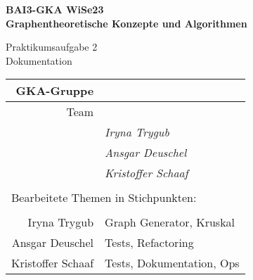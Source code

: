 

\thispagestyle{empty}
\begin{center}

    {\large {\bf   BAI3-GKA WiSe23 \\ Graphentheoretische Konzepte und Algorithmen \\[5mm]} }
    
{\huge Praktikumsaufgabe 2  \\[5mm] Dokumentation}\\

\end{center}

				\begin{tabular}[t]{|r|l|}
				 \hline
				GKA-Gruppe&                 \raisebox{-3mm}{\rule[8mm]{100mm}{0mm} }\\ \hline    
				Team &                                                        \\ \hline			
				& \textit{Iryna Trygub }               \\ \hline    
				& \textit{Ansgar Deuschel }               \\ \hline			
				& \textit{Kristoffer Schaaf }             \\ \hline  			
				\multicolumn{2}{c}{}\\  			
				\multicolumn{2}{l}{Bearbeitete Themen in Stichpunkten:}\\			
				\multicolumn{2}{c}{}\\  \hline
				Iryna Trygub & Graph Generator, Kruskal             \\ \hline    
				Ansgar Deuschel & Tests, Refactoring                \\ \hline			
				Kristoffer Schaaf & Tests, Dokumentation, Ops            \\ \hline 		
							
						
				\end{tabular}
~\\[4mm]
		
		
\vfill

